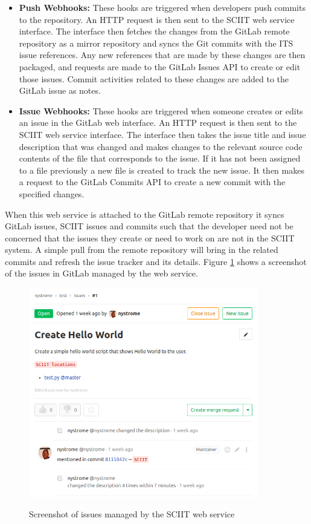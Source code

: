 \documentclass{mproj}
\begin{document}
\begin{itemize}
  \item \textbf{Push Webhooks:} These hooks are triggered when developers push commits to the repository. An HTTP request is then sent to the SCIIT web service interface. The interface then fetches the changes from the GitLab remote repository as a mirror repository and syncs the Git commits with the ITS issue references. Any new references that are made by these changes are then packaged, and requests are made to the GitLab Issues API to create or edit those issues. Commit activities related to these changes are added to the GitLab issue as notes.
  \item \textbf{Issue Webhooks:} These hooks are triggered when someone creates or edits an issue in the GitLab web interface. An HTTP request is then sent to the SCIIT web service interface. The interface then takes the issue title and issue description that was changed and makes changes to the relevant source code contents of the file that corresponds to the issue. If it has not been assigned to a file previously a new file is created to track the new issue. It then makes a request to the GitLab Commits API to create a new commit with the specified changes.
\end{itemize}

When this web service is attached to the GitLab remote repository it syncs GitLab issues, SCIIT issues and commits such that the developer need not be concerned that the issues they create or need to work on are not in the SCIIT system. A simple pull from the remote repository will bring in the related commits and refresh the issue tracker and its details. Figure \ref{fig:sciit-gitlab-shot} shows a screenshot of the issues in GitLab managed by the web service.


\begin{figure}[t]
\centering
  \caption{Screenshot of issues managed by the SCIIT web service}
  \includegraphics[width=10cm]{sciit-gitlab-shot}
  \label{fig:sciit-gitlab-shot}
\end{figure}
\end{document}
